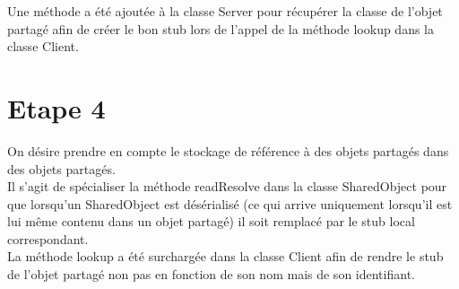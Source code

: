 \documentclass[a4paper,12pt]{article}
\begin{document}
Une méthode a été ajoutée à la classe Server pour récupérer la classe de l'objet partagé afin de créer le bon stub lors de l'appel de la méthode lookup dans la classe Client.


\clearpage
\section{Etape 4}

\bigskip
\bigskip
\bigskip
\bigskip

On désire prendre en compte le stockage de référence à des objets partagés dans des objets partagés.\\

Il s'agit de spécialiser la méthode readResolve dans la classe SharedObject pour que lorsqu'un SharedObject est désérialisé (ce qui arrive uniquement lorsqu'il est lui même contenu dans un objet partagé) il soit remplacé par le stub local correspondant.\\

La méthode lookup a été surchargée dans la classe Client afin de rendre le stub de l'objet partagé non pas en fonction de son nom mais de son identifiant.
\end{document}
